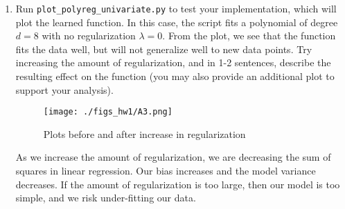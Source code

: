 \documentclass{article}
\begin{document}
\begin{aprob}
\begin{enumerate}
    \item {} Run \texttt{plot\_polyreg\_univariate.py} to test your implementation, which will plot the learned function.  In this case, the script fits a polynomial of degree $d=8$ with no regularization $\lambda = 0$.  From the plot, we see that the function fits the data well, but will not generalize well to new data points.  Try increasing the amount of regularization, and in 1-2 sentences, describe the resulting effect on the function (you may also provide an additional plot to support your analysis).
    
    \begin{figure}[htp] 
    \centering
    \vspace*{-0.1in}
    \texttt{[image: ./figs\_hw1/A3.png]}
    \caption{Plots before and after increase in regularization}
    \label{figs:A3b.png}
    \end{figure}
    
    As we increase the amount of regularization, we are decreasing the sum of squares in linear regression. Our bias increases and the model variance decreases. If the amount of regularization is too large, then our model is too simple, and we risk under-fitting our data.

    \end{enumerate}
\end{aprob}

\newpage
\end{document}
